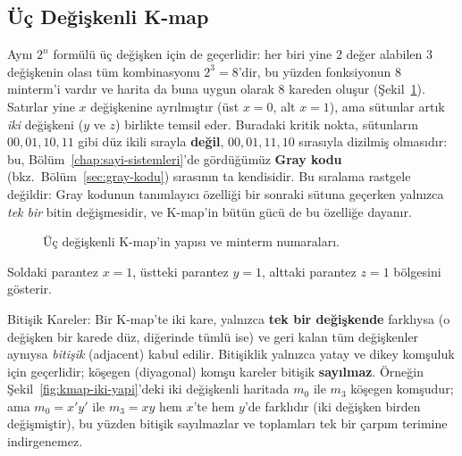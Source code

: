 \subsection{Üç Değişkenli K-map}
\label{sec:kmap-uc-degiskenli}

Aynı $2^n$ formülü üç değişken için de geçerlidir: her biri yine $2$ değer alabilen $3$
değişkenin olası tüm kombinasyonu $2^3=8$'dir, bu yüzden fonksiyonun $8$ minterm'i vardır
ve harita da buna uygun olarak $8$ kareden oluşur (Şekil~\ref{fig:kmap-uc-yapi}). Satırlar
yine $x$ değişkenine ayrılmıştır (üst $x=0$, alt $x=1$), ama sütunlar artık \emph{iki}
değişkeni ($y$ ve $z$) birlikte temsil eder. Buradaki kritik nokta, sütunların
$00,01,10,11$ gibi düz ikili sırayla \textbf{değil}, $00,01,11,10$ sırasıyla dizilmiş
olmasıdır: bu, Bölüm~\ref{chap:sayi-sistemleri}'de gördüğümüz \textbf{Gray
kodu} (bkz.~Bölüm~\ref{sec:gray-kodu}) sırasının ta
kendisidir. Bu sıralama rastgele değildir: Gray kodunun tanımlayıcı özelliği bir sonraki
sütuna geçerken yalnızca \emph{tek bir} bitin değişmesidir, ve K-map'in bütün gücü de bu
özelliğe dayanır.

\begin{figure}[H]
\centering
{}
\caption{Üç değişkenli K-map'in yapısı ve minterm numaraları.}
\label{fig:kmap-uc-yapi}
\end{figure}
Soldaki parantez $x=1$, üstteki parantez $y=1$, alttaki parantez $z=1$ bölgesini gösterir.

\begin{tanim}{Bitişik Kareler:}
Bir K-map'te iki kare, yalnızca \textbf{tek bir değişkende} farklıysa (o değişken bir
karede düz, diğerinde tümlü ise) ve geri kalan tüm değişkenler aynıysa \emph{bitişik}
(adjacent) kabul edilir. Bitişiklik yalnızca yatay ve dikey komşuluk için geçerlidir;
köşegen (diyagonal) komşu kareler bitişik \textbf{sayılmaz}. Örneğin
Şekil~\ref{fig:kmap-iki-yapi}'deki iki değişkenli haritada $m_0$ ile $m_3$ köşegen
komşudur; ama $m_0=x'y'$ ile $m_3=xy$ hem $x$'te hem $y$'de farklıdır (iki değişken
birden değişmiştir), bu yüzden bitişik sayılmazlar ve toplamları tek bir çarpım
terimine indirgenemez.
\end{tanim}

